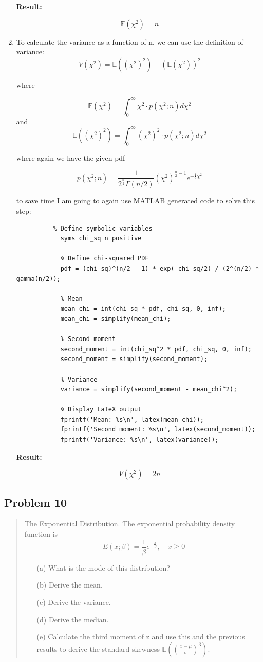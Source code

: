 \documentclass[10pt]{article}
\begin{document}
\begin{enumerate}[label=(\alph*)]
	      \textbf{Result:}

	      \[ \boxed{\mathbb{E}(\chi^2) = n} \]


	\item To calculate the variance as a function of n, we can use the definition of variance:
	      \[ V(\chi^2) = \mathbb{E}((\chi^2)^2) - (\mathbb{E}(\chi^2))^2 \]

	      where

	      \[ \mathbb{E}(\chi^2) = \int_0^\infty \chi^2 \cdot p(\chi^2; n) d\chi^2 \]
	      and
	      \[ \mathbb{E}((\chi^2)^2) = \int_0^\infty (\chi^2)^2 \cdot p(\chi^2; n) d\chi^2 \]

	      where again we have the given pdf

	      \[ p(\chi^{2};n)=\frac{1}{2^{\frac{n}{2}}\Gamma(n/2)}(\chi^{2})^{\frac{n}{2}-1}e^{-\frac{1}{2}\chi^{2}} \]


	      to save time I am going to again use MATLAB generated code to solve this step:

	      \begin{verbatim}
		  % Define symbolic variables
			syms chi_sq n positive

			% Define chi-squared PDF
			pdf = (chi_sq)^(n/2 - 1) * exp(-chi_sq/2) / (2^(n/2) * gamma(n/2));

			% Mean
			mean_chi = int(chi_sq * pdf, chi_sq, 0, inf);
			mean_chi = simplify(mean_chi);

			% Second moment
			second_moment = int(chi_sq^2 * pdf, chi_sq, 0, inf);
			second_moment = simplify(second_moment);

			% Variance
			variance = simplify(second_moment - mean_chi^2);

			% Display LaTeX output
			fprintf('Mean: %s\n', latex(mean_chi));
			fprintf('Second moment: %s\n', latex(second_moment));
			fprintf('Variance: %s\n', latex(variance));
		  \end{verbatim}

	      \textbf{Result:}

	      \[ \boxed{V(\chi^2) = 2n} \]


\end{enumerate}
\subsection*{Problem 10}
\begin{quote}
	The Exponential Distribution. The exponential probability density function is
	$$ E(x;\beta)=\frac{1}{\beta}e^{-\frac{x}{\beta}}, \quad x\ge0 $$
	\begin{enumerate}
		\item[(a)] What is the mode of this distribution?
		\item[(b)] Derive the mean.
		\item[(c)] Derive the variance.
		\item[(d)] Derive the median.
		\item[(e)] Calculate the third moment of z and use this and the previous results to derive the standard skewness $\mathbb{E}((\frac{x-\mu}{\sigma})^{3})$.
	\end{enumerate}
\end{quote}
\end{document}
